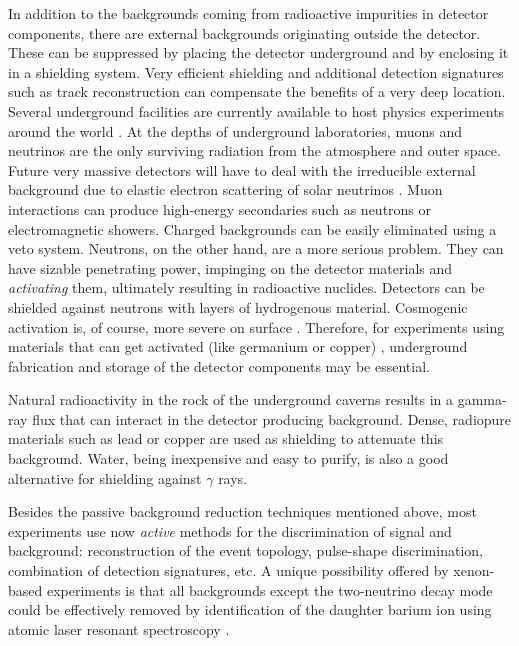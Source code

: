 \documentclass{PoS}
\begin{document}
In addition to the backgrounds coming from radioactive impurities in detector components, there are external backgrounds originating outside the detector. These can be suppressed by placing the detector underground and by enclosing it in a shielding system. Very efficient shielding and additional detection signatures such as track reconstruction can compensate the benefits of a very deep location. Several underground facilities are currently available to host physics experiments around the world \cite{Bettini:2011zza}. 
At the depths of underground laboratories, muons and neutrinos are the only surviving radiation from the atmosphere and outer space. Future very massive detectors will have to deal with the irreducible external background due to elastic electron scattering of solar neutrinos \cite{deBarros:2011qq}. Muon interactions can produce high-energy secondaries such as neutrons or electromagnetic showers. Charged backgrounds can be easily eliminated using a veto system. Neutrons, on the other hand, are a more serious problem. They can have sizable penetrating power, impinging on the detector materials and \emph{activating} them, ultimately resulting in radioactive nuclides. Detectors can be shielded against neutrons with layers of hydrogenous material. Cosmogenic activation is, of course, more severe on surface . Therefore, for experiments using materials that can get activated (like germanium or copper) \cite{Cebrian:2010zz}, underground fabrication and storage of the detector components may be essential. 

Natural radioactivity in the rock of the underground caverns results in a gamma-ray flux that can interact in the detector producing background. Dense, radiopure materials such as lead or copper are used as shielding to attenuate this background. Water, being inexpensive and easy to purify, is also a good alternative for shielding against $\gamma$ rays.

Besides the passive background reduction techniques mentioned above, most experiments use now \emph{active} methods for the discrimination of signal and background: reconstruction of the event topology, pulse-shape discrimination, combination of detection signatures, etc. A unique possibility offered by xenon-based experiments is that all backgrounds except the two-neutrino decay mode could be effectively removed by identification of the daughter barium ion using atomic laser resonant spectroscopy \cite{Moe:1991ik}.


\end{document}
